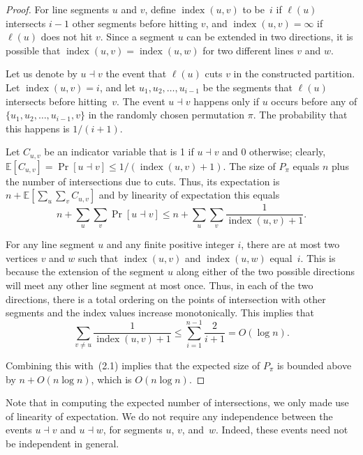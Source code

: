 \documentclass[twoside,12pt]{book}
\theoremstyle{plain}
\theoremstyle{definition}
\theoremstyle{remark}
\begin{document}
\begin{proof}
For line segments $u$ and $v$, define $\operatorname{index}(u,v)$ to be~$i$
if $\ell(u)$ intersects $i{-}1$ other segments before hitting $v$, and
$\operatorname{index}(u,v)=\infty$ if $\ell(u)$ does not hit $v$.  Since a
segment $u$ can be extended in two directions, it is possible that
$\operatorname{index}(u,v)=\operatorname{index}(u,w)$ for two different
lines $v$ and $w$.

Let us denote by $u\dashv v$ the event that $\ell(u)$ cuts $v$ in the
constructed partition.  Let $\operatorname{index}(u,v)=i$, and let
$u_1,u_2,\ldots,u_{i-1}$ be the segments that $\ell(u)$ intersects before
hitting~$v$.  The event $u\dashv v$ happens only if $u$ occurs before any
of $\{u_1,u_2,\ldots,u_{i-1},v\}$ in the randomly chosen permutation
$\pi$.  The probability that this happens is $1/(i+1)$.

Let $C_{u,v}$ be an indicator variable that is 1 if $u\dashv v$ and 0
otherwise; clearly,
$\mathbb{E}[C_{u,v}]=\Pr[u\dashv v]\le 1/(\operatorname{index}(u,v)+1)$.
The size of $P_\pi$ equals $n$ plus the number of intersections due to cuts.
Thus, its expectation is
$n+\mathbb{E}[\sum_u\sum_v C_{u,v}]$ and by linearity of expectation this
equals
\begin{equation*}
  n + \sum_u \sum_v \Pr[u\dashv v]
  \le n + \sum_u \sum_v
    \frac{1}{\operatorname{index}(u,v)+1}.
  \tag{2.1}
\end{equation*}

For any line segment $u$ and any finite positive integer $i$, there are at
most two vertices $v$ and $w$ such that $\operatorname{index}(u,v)$ and
$\operatorname{index}(u,w)$ equal~$i$.  This is because the extension of the
segment $u$ along either of the two possible directions will meet any other
line segment at most once.  Thus, in each of the two directions, there is a
total ordering on the points of intersection with other segments and the
index values increase monotonically.  This implies that
\begin{equation*}
  \sum_{v\ne u} \frac{1}{\operatorname{index}(u,v)+1}
  \le \sum_{i=1}^{n-1} \frac{2}{i+1}
  = O(\log n).
  \tag{2.2}
\end{equation*}

Combining this with~(2.1) implies that the expected size of $P_\pi$ is
bounded above by $n+O(n\log n)$, which is $O(n\log n)$.
\end{proof}

Note that in computing the expected number of intersections, we only made
use of linearity of expectation.  We do not require any independence between
the events $u\dashv v$ and $u\dashv w$, for segments $u$, $v$, and~$w$.
Indeed, these events need not be independent in general.
\end{document}
